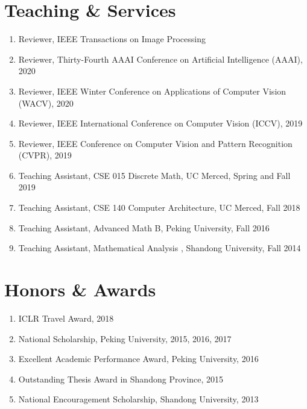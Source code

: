 \documentclass[letterpaper]{article}
\def\footerlink{http://jblevins.org/projects/cv-template/}
\begin{document}
\section*{Teaching \& Services}

\begin{enumerate}

\item Reviewer, IEEE Transactions on Image Processing

\item Reviewer, Thirty-Fourth AAAI Conference on Artificial Intelligence (AAAI), 2020

\item Reviewer, IEEE Winter Conference on Applications of Computer Vision (WACV), 2020

\item Reviewer, IEEE International Conference on Computer Vision (ICCV), 2019

\item Reviewer, IEEE Conference on Computer Vision and Pattern Recognition (CVPR), 2019 

\item Teaching Assistant, CSE 015 Discrete Math, UC Merced, Spring and Fall 2019

\item Teaching Assistant, CSE 140 Computer Architecture, UC Merced, Fall 2018

\item Teaching Assistant, Advanced Math B, Peking University, Fall 2016

\item Teaching Assistant, Mathematical Analysis \uppercase\expandafter{}, Shandong University, Fall 2014

\end{enumerate}


\section*{Honors \& Awards}

\begin{enumerate}

\item ICLR Travel Award, 2018

\item National Scholarship, Peking University, 2015, 2016, 2017

\item Excellent Academic Performance Award, Peking University, 2016

\item Outstanding Thesis Award in Shandong Province, 2015

\item National Encouragement Scholarship, Shandong University, 2013

\end{enumerate}


\bigskip

\end{document}
